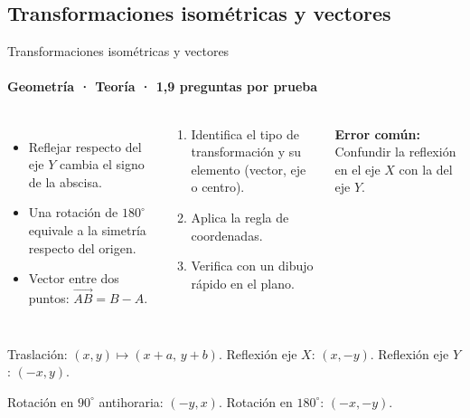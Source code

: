 \documentclass[aspectratio=169,11pt]{beamer}
\newlength{\ajustealto}
\newenvironment{ajustar}[1][0.74\textheight]
  {\setlength{\ajustealto}{#1}\begin{lrbox}{\ajustecaja}\begin{minipage}{\textwidth}}
  {\end{minipage}\end{lrbox}%
   \ifdim\dimexpr\ht\ajustecaja+\dp\ajustecaja\relax>\ajustealto
     \resizebox*{!}{\ajustealto}{\usebox{\ajustecaja}}\else\usebox{\ajustecaja}\fi}
\begin{document}
\subsection{Transformaciones isométricas y vectores}

\begin{frame}{Transformaciones isométricas y vectores}
\label{tema-m1-transformaciones}
\framesubtitle{Geometría · Teoría · 1,9 preguntas por prueba}
\begin{ajustar}
\begin{columns}[T,onlytextwidth]
\begin{itemize}\footnotesize
\item Reflejar respecto del eje $Y$ cambia el signo de la abscisa.
\item Una rotación de $180^\circ$ equivale a la simetría respecto del origen.
\item Vector entre dos puntos: $\overrightarrow{AB}=B-A$.
\end{itemize}
\begin{cajaregla}\scriptsize \begin{enumerate}\item Identifica el tipo de transformación y su elemento (vector, eje o centro).\item Aplica la regla de coordenadas.\item Verifica con un dibujo rápido en el plano.\end{enumerate}\end{cajaregla}
\begin{notagris}\scriptsize \textbf{Error común:} Confundir la reflexión en el eje $X$ con la del eje $Y$.\end{notagris}
\end{columns}
\begin{cajaclave}\footnotesize
Traslación: $(x,y)\mapsto(x+a,\,y+b)$. Reflexión eje $X$: $(x,-y)$. Reflexión eje $Y$: $(-x,y)$.

Rotación en $90^\circ$ antihoraria: $(-y,x)$. Rotación en $180^\circ$: $(-x,-y)$.
\end{cajaclave}
\end{ajustar}
\end{frame}
\end{document}
